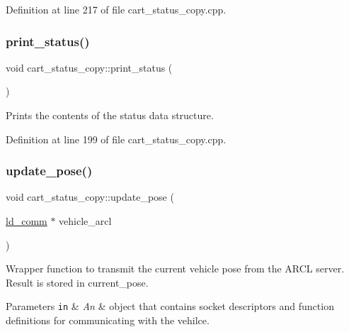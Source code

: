 Definition at line 217 of file cart\+\_\+status\+\_\+copy.\+cpp.

\mbox{\label{classcart__status__copy_a6a05f2781c3c5547b9f5fff2161b829f}} 
\subsubsection{\texorpdfstring{print\+\_\+status()}{print\_status()}}
{\footnotesize\ttfamily void cart\+\_\+status\+\_\+copy\+::print\+\_\+status (\begin{DoxyParamCaption}{ }\end{DoxyParamCaption})}

Prints the contents of the status data structure. 

Definition at line 199 of file cart\+\_\+status\+\_\+copy.\+cpp.

\mbox{\label{classcart__status__copy_abc65e581df602a25f173e06ae5d453bf}} 
\subsubsection{\texorpdfstring{update\+\_\+pose()}{update\_pose()}\hspace{0.1cm}{\footnotesize\ttfamily [1/2]}}
{\footnotesize\ttfamily void cart\+\_\+status\+\_\+copy\+::update\+\_\+pose (\begin{DoxyParamCaption}\item[{\mbox{\hyperlink{classld__comm}{ld\+\_\+comm}} $\ast$}]{vehicle\+\_\+arcl }\end{DoxyParamCaption})}

Wrapper function to transmit the current vehicle pose from the A\+R\+CL server. Result is stored in current\+\_\+pose. 
\begin{DoxyParams}[1]{Parameters}
\mbox{\tt in}  & {\em An} & object that contains socket descriptors and function definitions for communicating with the vehilce. \\
\hline
\end{DoxyParams}


